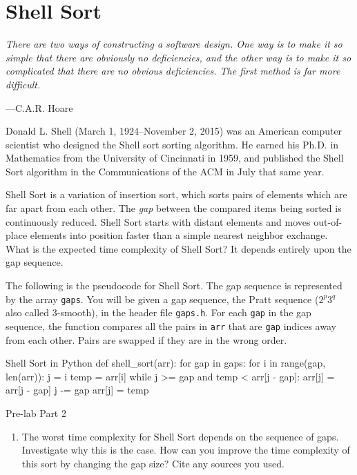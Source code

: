 \documentclass[11pt]{article}
\begin{document}
\section{Shell Sort}

\epigraph{\emph{There are two ways of constructing a software design.
    One way is to make it so simple that there are obviously no
    deficiencies, and the other way is to make it so complicated that
    there are no obvious deficiencies. The first method is far more
difficult.}}{---C.A.R. Hoare}

\noindent
Donald L. Shell (March 1, 1924--November 2, 2015) was an American
computer scientist who designed the Shell sort sorting algorithm.
He earned his Ph.D. in Mathematics from the University of Cincinnati
in 1959, and published the Shell Sort algorithm in the Communications
of the ACM in July that same year.

Shell Sort is a variation of insertion sort, which sorts pairs of
elements which are far apart from each other. The \emph{gap} between the
compared items being sorted is continuously reduced. Shell Sort starts
with distant elements and moves out-of-place elements into position
faster than a simple nearest neighbor exchange. What is the expected
time complexity of Shell Sort? It depends entirely upon the gap
sequence.

The following is the pseudocode for Shell Sort. The gap sequence is
represented by the array \texttt{gaps}. You will be given a gap
sequence, the Pratt sequence ($2^p 3^q$ also called $3$-smooth), in the
header file \texttt{gaps.h}.  For each \texttt{gap} in the gap sequence,
the function compares all the pairs in \texttt{arr} that are
\texttt{gap} indices away from each other. Pairs are swapped if they are
in the wrong order.

\begin{pythonlisting}{Shell Sort in Python}
def shell_sort(arr):
    for gap in gaps:
        for i in range(gap, len(arr)):
            j = i
            temp = arr[i]
            while j >= gap and temp < arr[j - gap]:
                arr[j] = arr[j - gap]
                j -= gap
            arr[j] = temp
\end{pythonlisting}

\medskip
\begin{prelab}{Pre-lab Part 2}
  \begin{enumerate}
    \item The worst time complexity for Shell Sort depends on the
      sequence of gaps. Investigate why this is the case. How can you
      improve the time complexity of this sort by changing the gap size?
      Cite any sources you used.
  \end{enumerate}
\end{prelab}
\end{document}

